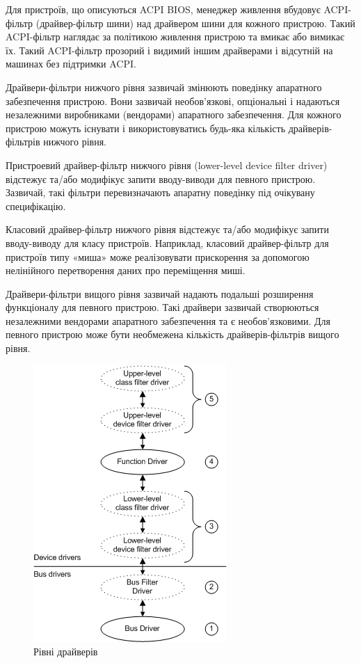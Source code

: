 \documentclass[
	a4paper,
	oneside,
	BCOR = 10mm,
	DIV = 12,
	12pt,
	headings = normal,
]{scrartcl}
\begin{document}
		Для пристроїв, що описуються ACPI BIOS, менеджер живлення вбудовує ACPI-фільтр (драйвер-фільтр шини) над драйвером шини для кожного пристрою. Такий ACPI-фільтр наглядає за політикою живлення пристрою та вмикає або вимикає їх. Такий ACPI-фільтр прозорий і видимий іншим драйверами і відсутній на машинах без підтримки ACPI.

		Драйвери-фільтри нижчого рівня зазвичай змінюють поведінку апаратного забезпечення пристрою. Вони зазвичай необов'язкові, опціональні і надаються незалежними виробниками (вендорами) апаратного забезпечення. Для кожного пристрою можуть існувати і використовуватись будь-яка кількість драйверів-фільтрів нижчого рівня.

		Пристроевий драйвер-фільтр нижчого рівня (lower-level device filter driver) відстежує та/або модифікує запити вводу-виводи для певного пристрою. Зазвичай, такі фільтри перевизначають апаратну поведінку під очікувану специфікацію.

		Класовий драйвер-фільтр нижчого рівня відстежує та/або модифікує запити вводу-виводу для класу пристроїв. Наприклад, класовий драйвер-фільтр для пристроїв типу «миша» може реалізовувати прискорення за допомогою нелінійного перетворення даних про переміщення миші.

		Драйвери-фільтри вищого рівня зазвичай надають подальші розширення функціоналу для певного пристрою. Такі драйвери зазвичай створюються незалежними вендорами апаратного забезпечення та є необов'язковими. Для певного пристрою може бути необмежена кількість драйверів-фільтрів вищого рівня.

		\begin{figure}[!htbp]
			\centering
			\includegraphics[height = 10\baselineskip]{./assets/y03s01-syssoft-mod-01-klokun-02-01.png}
			\caption{Рівні драйверів}
			\label{fig:02-01-driver-levels}
		\end{figure}
\end{document}
